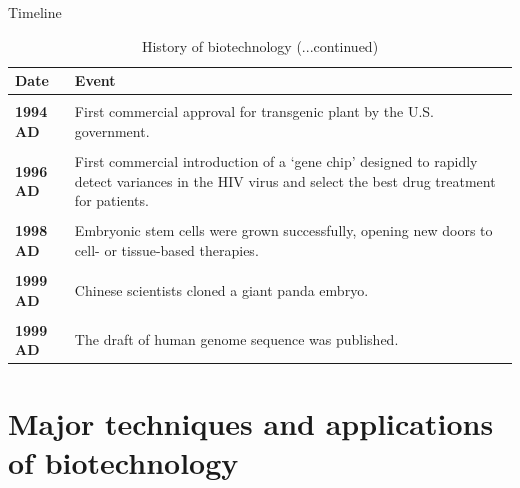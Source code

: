 \documentclass[
  ignorenonframetext,
  aspectratio=169]{beamer}
\begin{document}
\begin{frame}{Timeline}
\protect\hypertarget{timeline-2}{}
\begin{table}

\caption{\label{tab:biotechnology-history3}History of biotechnology (...continued)}
\centering
\fontsize{5}{7}\selectfont
\begin{tabular}[t]{>{}l>{\raggedright\arraybackslash}p{40em}}
\toprule
Date & Event\\
\midrule
\textbf{\cellcolor{gray!6}{1992 AD}} & \cellcolor{gray!6}{Techniques for testing embryos for inherited diseases were developed}\\
\textbf{1994 AD} & First commercial approval for transgenic plant by the U.S. government.\\
\textbf{\cellcolor{gray!6}{1995 AD}} & \cellcolor{gray!6}{First successful xenotransplantation trial was conducted, transplanting a heart from a genetically-engineered pig into a baboon.}\\
\textbf{1996 AD} & First commercial introduction of a ‘gene chip’ designed to rapidly detect variances in the HIV virus and select the best drug treatment for patients.\\
\textbf{\cellcolor{gray!6}{1996 AD}} & \cellcolor{gray!6}{Dolly, the sheep was cloned from a cell of an adult sheep.}\\
\addlinespace
\textbf{1998 AD} & Embryonic stem cells were grown successfully, opening new doors to cell- or tissue-based therapies.\\
\textbf{\cellcolor{gray!6}{1999 AD}} & \cellcolor{gray!6}{A U.S. company announced the successful cloning of human embryonic cells from an adult skin cell.}\\
\textbf{1999 AD} & Chinese scientists cloned a giant panda embryo.\\
\textbf{\cellcolor{gray!6}{1999 AD}} & \cellcolor{gray!6}{Indian scientists and companies started producing recombinant vaccines, hormones, and other drugs.}\\
\textbf{1999 AD} & The draft of human genome sequence was published.\\
\bottomrule
\end{tabular}
\end{table}
\end{frame}

\hypertarget{major-techniques-and-applications-of-biotechnology}{%
\section{Major techniques and applications of
biotechnology}\label{major-techniques-and-applications-of-biotechnology}}
\end{document}
